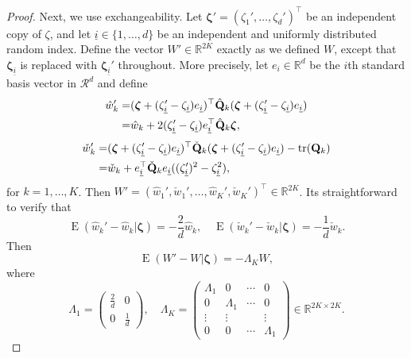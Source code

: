 \documentclass[11pt]{article}
\DeclareMathOperator{\mytr}{tr}
\DeclareMathOperator{\myE}{E}
\newcommand{\bfsym}[1]{\ensuremath{\boldsymbol{#1}}}
\def\bzeta{\bfsym {\zeta}}
\theoremstyle{plain}
\theoremstyle{definition}
\theoremstyle{remark}
\begin{document}
\begin{proof}
Next, we use exchangeability.
Let $\bzeta' = (\zeta_1',\ldots, \zeta_d')^\top$ be an independent copy of $\zeta$, and let $\underline i \in \{1,\ldots, d\}$ be an independent and uniformly distributed random index.
Define the vector $W' \in \mathbb R^{2K}$ exactly as we defined $W$, except that $\bzeta_{\underline i}$ is replaced with $\bzeta_{\underline i}'$ throughout.
More precisely, let $e_i \in \mathbb R^d$ be the $i$th standard basis vector in $\mathcal R^d$ and define
\begin{equation*}
\begin{split}
    \hat w_k'=& (\bzeta + (\zeta_{\underline i}' - \zeta_{\underline i}) e_{\underline i})^\top 
    \hat \BQ_k
    (\bzeta + (\zeta_{\underline i}' - \zeta_{\underline i}) e_{\underline i})
\\
=& \hat w_k + 2 (\zeta_{\underline i}' - \zeta_{\underline i}) e_{\underline i}^\top \hat \BQ_k \bzeta,
\end{split}
\end{equation*}
\begin{equation*}
\begin{split}
    \check w_k'=& (\bzeta + (\zeta_{\underline i}' - \zeta_{\underline i}) e_{\underline i})^\top 
    \check \BQ_k
    (\bzeta + (\zeta_{\underline i}' - \zeta_{\underline i}) e_{\underline i})
    -\mytr(\BQ_k)
\\
=& \check w_k +  e_{\underline i}^\top \check \BQ_k e_{\underline i} ((\zeta_{\underline i}')^2 - \zeta_{\underline i}^2) ,
\end{split}
\end{equation*}
for $k=1,\ldots, K$.
Then $W'= (\hat w_1',\check w_1', \ldots, \hat w_K', \check w_K')^\top \in \mathbb R^{2K}$.
Its straightforward to verify that
\begin{equation*}
    \myE (\hat w_k' - \hat w_k|\bzeta)=-\frac{2}{d} \hat w_k,
    \quad
    \myE (\check w_k' - \check w_k|\bzeta)=-\frac{1}{d} \check w_k.
\end{equation*}
Then
\begin{equation*}
    \myE ( W' - W |\bzeta) = - \Lambda_K W,
\end{equation*}
where
\begin{equation*}
    \Lambda_1=
    \begin{pmatrix}
       \frac 2 d & 0\\
       0 & \frac 1 d
    \end{pmatrix}
    ,
    \quad
    \Lambda_K =
    \begin{pmatrix}
        \Lambda_1 & 0 & \cdots & 0\\
         0 &\Lambda_1  & \cdots & 0\\
         \vdots & \vdots && \vdots\\
         0 & 0 & \cdots & \Lambda_1
    \end{pmatrix}
    \in \mathbb R^{2K\times 2K}.
\end{equation*}


\end{proof}
\end{document}
